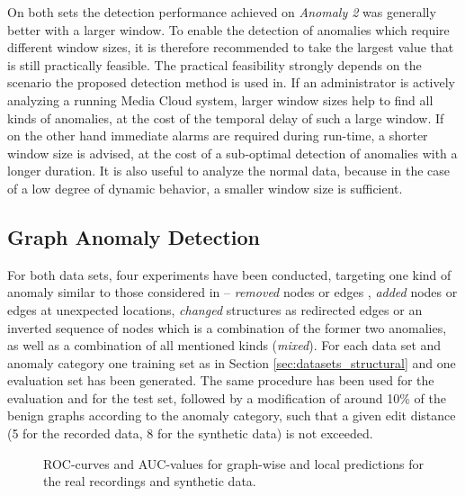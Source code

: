 \documentclass{llncs}
\begin{document}
On both sets the detection performance achieved on \textit{Anomaly 2} was generally better with a larger window. To enable the detection of anomalies which require different window sizes, it is therefore recommended to take the largest value that is still practically feasible. The practical feasibility strongly depends on the scenario the proposed detection method is used in. If an administrator is actively analyzing a running Media Cloud system, larger window sizes help to find all kinds of anomalies, at the cost of the temporal delay of such a large window. If on the other hand immediate alarms are required during run-time, a shorter window size is advised, at the cost of a sub-optimal detection of anomalies with a longer duration. It is also useful to analyze the normal data, because in the case of a low degree of dynamic behavior, a smaller window size is sufficient.
 
\subsection{Graph Anomaly Detection}
\label{graphanomalydetection}

For both data sets, four experiments have been conducted, targeting one kind of anomaly similar to those considered in \cite{eberle2007mining} -- \emph{removed} nodes or edges , \emph{added} nodes or edges at unexpected locations, \emph{changed} structures as redirected edges or an inverted sequence of nodes which is a combination of the former two anomalies, as well as a combination of all mentioned kinds (\emph{mixed}). For each data set and anomaly category one training set as in Section \ref{sec:datasets_structural} and one evaluation set has been generated. The same procedure has been used for the evaluation and for the test set, followed by a modification of around 10\% of the benign graphs according to the anomaly category, such that a given edit distance (5 for the recorded data, 8 for the synthetic data) is not exceeded.
\begin{figure}[ht]
\vspace{-5mm}
 \hfill
{}
 \vspace{-3mm}
 \hfill
 \caption{ROC-curves and AUC-values for graph-wise and local predictions for the real recordings and synthetic data.}
  \label{fig:struct_rocs}
  \vspace{-3mm}
\end{figure}
\end{document}
